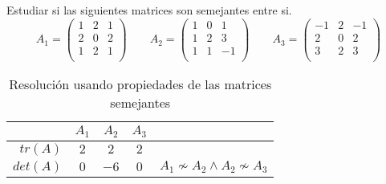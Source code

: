 \begin{ejercicio}
    Estudiar si las siguientes matrices son semejantes entre si.
    \begin{equation*}
        A_1 = \left( \begin{array}{ccc}
            1 & 2 & 1 \\
            2 & 0 & 2 \\
            1 & 2 & 1 \\
        \end{array}\right) \qquad
        A_2 = \left( \begin{array}{ccc}
            1 & 0 & 1 \\
            1 & 2 & 3 \\
            1 & 1 & -1 \\
        \end{array}\right) \qquad
        A_3 = \left( \begin{array}{ccc}
            -1 & 2 & -1 \\
            2 & 0 & 2 \\
            3 & 2 & 3 \\
        \end{array}\right)
    \end{equation*}
    \begin{table}[H]
        \centering
        \begin{tabular}{r|ccc|l}
             & $A_1$ & $A_2$ & $A_3$ & \\ \hline
             $tr(A)$ & $2$ & $2$ & $2$ &\\
             $det(A)$ & $0$ & $-6$ & $0$ & $A_1 \nsim A_2 \land A_2 \nsim A_3$\\
        \end{tabular}
        \caption{Resolución usando propiedades de las matrices semejantes}
    \end{table}


\end{ejercicio}
